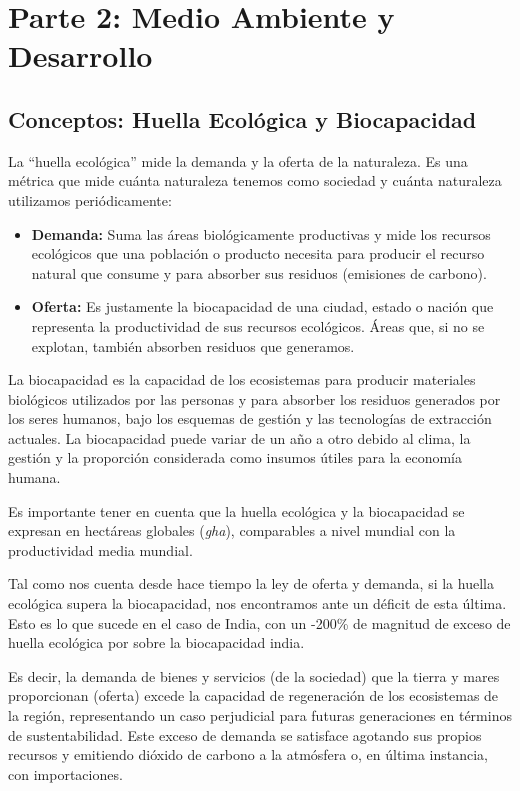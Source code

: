 \documentclass[11pt, a4paper]{article}
\begin{document}
\section{Parte 2: Medio Ambiente y Desarrollo}

\subsection{Conceptos: Huella Ecológica y Biocapacidad}
La ``huella ecológica'' mide la demanda y la oferta de la naturaleza. Es una métrica que mide cuánta naturaleza tenemos como sociedad y cuánta naturaleza utilizamos periódicamente:
\begin{itemize}
    \item \textbf{Demanda:} Suma las áreas biológicamente productivas y mide los recursos ecológicos que una población o producto necesita para producir el recurso natural que consume y para absorber sus residuos (emisiones de carbono).
    \item \textbf{Oferta:} Es justamente la biocapacidad de una ciudad, estado o nación que representa la productividad de sus recursos ecológicos. Áreas que, si no se explotan, también absorben residuos que generamos.
\end{itemize}

La biocapacidad es la capacidad de los ecosistemas para producir materiales biológicos utilizados por las personas y para absorber los residuos generados por los seres humanos, bajo los esquemas de gestión y las tecnologías de extracción actuales. La biocapacidad puede variar de un año a otro debido al clima, la gestión y la proporción considerada como insumos útiles para la economía humana.

Es importante tener en cuenta que la huella ecológica y la biocapacidad se expresan en hectáreas globales (\textit{gha}), comparables a nivel mundial con la productividad media mundial.

Tal como nos cuenta desde hace tiempo la ley de oferta y demanda, si la huella ecológica supera la biocapacidad, nos encontramos ante un déficit de esta última. Esto es lo que sucede en el caso de India, con un -200\% de magnitud de exceso de huella ecológica por sobre la biocapacidad india.

Es decir, la demanda de bienes y servicios (de la sociedad) que la tierra y mares proporcionan (oferta) excede la capacidad de regeneración de los ecosistemas de la región, representando un caso perjudicial para futuras generaciones en términos de sustentabilidad. Este exceso de demanda se satisface agotando sus propios recursos y emitiendo dióxido de carbono a la atmósfera o, en última instancia, con importaciones.
\end{document}
